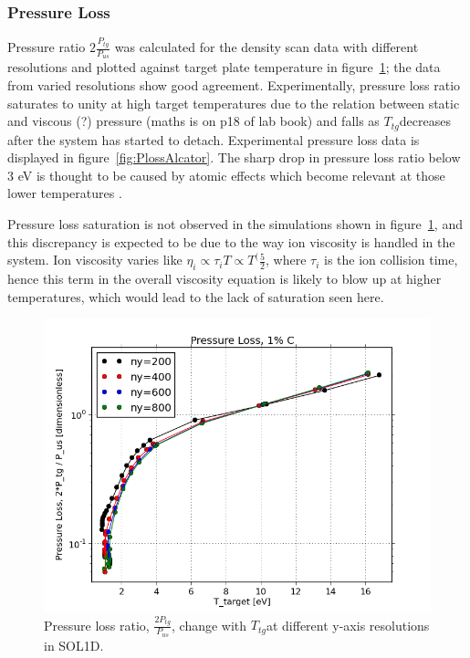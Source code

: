 \documentclass[11pt, twocolumn]{article}  %
\providecommand{\Ttg}{$T_{tg}$} %
\begin{document}
\subsubsection{Pressure Loss}\label{sssec:Ploss}
Pressure ratio $2\frac{P_{tg}}{P_{us}}$ was calculated for the density scan data with different resolutions and plotted against target plate temperature in figure~\ref{fig:PL_IMPCOMBO2logy}; the data from varied resolutions show good agreement. Experimentally, pressure loss ratio saturates to unity at high target temperatures due to the relation between static and viscous (?) pressure (maths is on p18 of lab book) and falls as \Ttg decreases after the system has started to detach. Experimental pressure loss data is displayed in figure~\ref{fig:PlossAlcator}. The sharp drop in pressure loss ratio below 3 eV is thought to be caused by atomic effects which become relevant at those lower temperatures \cite{Pitcher1997}.

Pressure loss saturation is not observed in the simulations shown in figure~\ref{fig:PL_IMPCOMBO2logy}, and this discrepancy is expected to be due to the way ion viscosity is handled in the system. Ion viscosity varies like $\eta_i \propto \tau_i T \propto T^(\frac{5}{2}$, where $\tau_i$ is the ion collision time, hence this term in the overall viscosity equation is likely to blow up at higher temperatures, which would lead to the lack of saturation seen here. 

\begin{figure}
\includegraphics[scale=0.5]{Figures/sol1d/PL_IMPCOMBO2logy.png}
\centering
\caption{Pressure loss ratio, $\frac{2P_{tg}}{P_{us}}$, change with \Ttg at different y-axis resolutions in SOL1D.}\label{fig:PL_IMPCOMBO2logy}
\end{figure}
\end{document}

